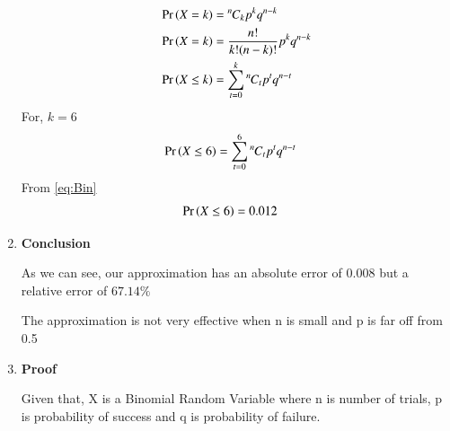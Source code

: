 \documentclass[journal,12pt,twocolumn]{IEEEtran}
\newcommand{\permcomb}[4][0mu]{{{}^{#3}\mkern#1#2_{#4}}}
\newcommand{\comb}[1][-1mu]{\permcomb[#1]{C}}
\begin{document}
\begin{enumerate}
\begin{align}
    \pr{X=k} &= \comb{n}{k}p^k q^{n-k}\\
    \pr{X = k} &= \frac{n!}{k!(n-k)!}p^kq^{n-k}\\
    \pr{X \le k} &= \sum_{t=0}^{k} \comb{n}{t}p^t q^{n-t}
\end{align}
For, $k=6$
\begin{align}
    \label{eq:Bin}
    \pr{X \le 6} &= \sum_{t=0}^{6} \comb{n}{t}p^t q^{n-t}
\end{align}
From \eqref{eq:Bin}
\begin{align}
    \Pr\left(X\le 6\right) &= 0.012
\end{align}
\item 
\textbf{Conclusion}

As we can see, our approximation has an absolute error of $0.008$ but a relative error of $67.14\%$

The approximation is not very effective when n is small and p is far off from 0.5
\item 
\textbf{Proof}

Given that, X is a Binomial Random Variable where n is number of trials, p is probability of success and q is probability of failure.


\end{enumerate}
\end{document}
